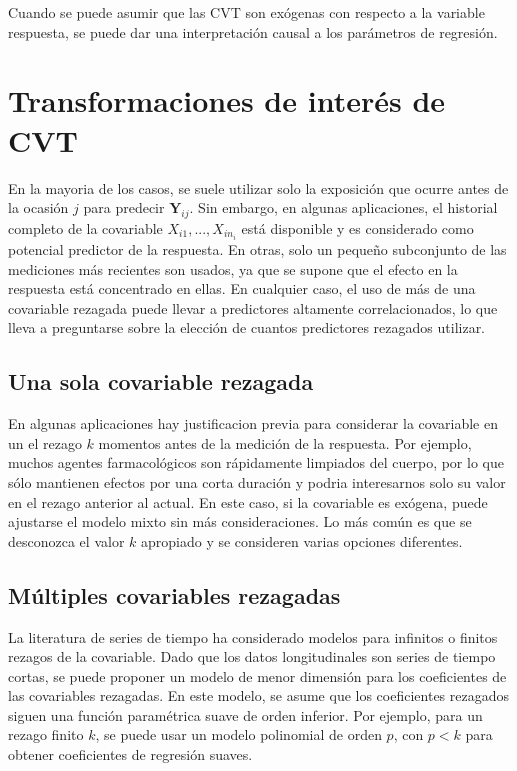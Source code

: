 \documentclass[spanish]{article}
\numberwithin{figure}{subsection}
\numberwithin{equation}{subsection}
\numberwithin{table}{subsection}
\begin{document}
Cuando se puede asumir que las CVT son exógenas con respecto a la variable
respuesta, se puede dar una interpretación causal a los parámetros de regresión.



\section{Transformaciones de interés de CVT}

En la mayoria de los casos, se suele utilizar solo la exposición que ocurre
antes de la ocasión $j$ para predecir $\bm{Y}_{ij}$. Sin embargo, en algunas
aplicaciones, el historial completo de la covariable $X_{i1}, ..., X_{in_i}$
está disponible y es considerado como potencial predictor de la respuesta. En
otras, solo un pequeño subconjunto de las mediciones más recientes son usados,
ya que se supone que el efecto en la respuesta está concentrado en ellas. En
cualquier caso, el uso de más de una covariable rezagada puede llevar a
predictores altamente correlacionados, lo que lleva a preguntarse sobre la
elección de cuantos predictores rezagados utilizar.

\subsection{Una sola covariable rezagada}

En algunas aplicaciones hay justificacion previa para considerar la covariable
en un el rezago $k$ momentos antes de la medición de la respuesta. Por ejemplo,
muchos agentes farmacológicos son rápidamente limpiados del cuerpo, por lo que
sólo mantienen efectos por una corta duración y podria interesarnos solo su
valor en el rezago anterior al actual. En este caso, si la covariable es
exógena, puede ajustarse el modelo mixto sin más consideraciones. Lo más común
es que se desconozca el valor $k$ apropiado y se consideren varias opciones
diferentes.

\subsection{Múltiples covariables rezagadas}

La literatura de series de tiempo ha considerado modelos para infinitos o
finitos rezagos de la covariable. Dado que los datos longitudinales son series
de tiempo cortas, se puede proponer un modelo de menor dimensión para los
coeficientes de las covariables rezagadas. En este modelo, se asume que los
coeficientes rezagados siguen una función paramétrica suave de orden inferior.
Por ejemplo, para un rezago finito $k$, se puede usar un modelo polinomial de
orden $p$, con $p < k$ para obtener coeficientes de regresión suaves.
\end{document}
